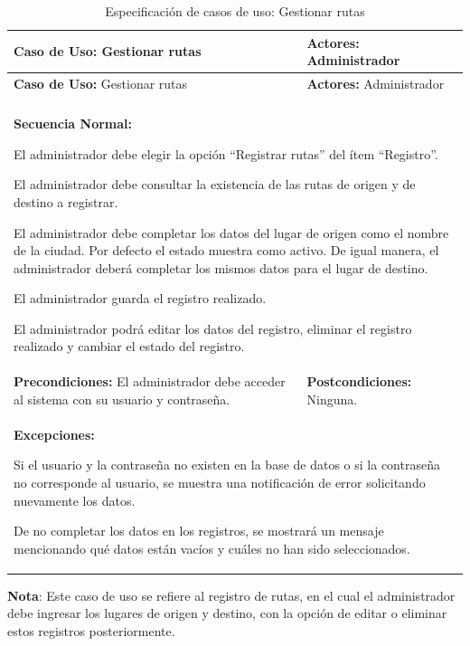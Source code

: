 	
	\begingroup
	
	\begin{longtable}{m{7.5cm}|m{7.5cm}}
		\caption[Especificación de casos de uso: Gestionar rutas]{\newline Especificación de casos de uso: Gestionar rutas} \label{tab:tabla3_4}\\
		\toprule
		\textbf{Caso de Uso:} Gestionar rutas & \textbf{Actores:} Administrador \\
		\midrule
		\endfirsthead
		
		\textbf{Caso de Uso:} Gestionar rutas & \textbf{Actores:} Administrador \\
		\midrule
		\endhead
		
		\bottomrule
		\endlastfoot
		
		\multicolumn{2}{m{15cm}}{\textbf{Descripción:} Este caso de uso hace referencia al registro de los lugares de origen y destino.} \\ \hline
		
		\multicolumn{2}{m{15cm}}{\textbf{Secuencia Normal:}
			
			El administrador debe elegir la opción “Registrar rutas” del ítem “Registro”.
			
			El administrador debe consultar la existencia de las rutas de origen y de destino a registrar.
			
			El administrador debe completar los datos del lugar de origen como el nombre de la ciudad. Por defecto el estado muestra como activo. De igual manera, el administrador deberá completar los mismos datos para el lugar de destino.
			
			El administrador guarda el registro realizado.
			
			El administrador podrá editar los datos del registro, eliminar el registro realizado y cambiar el estado del registro.
		} \\ \hline
		
		\textbf{Precondiciones:} El administrador debe acceder al sistema con su usuario y contraseña. & \textbf{Postcondiciones:} Ninguna. \\ \hline
		
		\multicolumn{2}{m{15cm}}{\textbf{Excepciones:}
			
			Si el usuario y la contraseña no existen en la base de datos o si la contraseña no corresponde al usuario, se muestra una notificación de error solicitando nuevamente los datos.
			
			De no completar los datos en los registros, se mostrará un mensaje mencionando qué datos están vacíos y cuáles no han sido seleccionados.
		} \\
	\end{longtable}
	\endgroup
	\vspace{-6pt}  %
	\textbf{Nota}: Este caso de uso se refiere al registro de rutas, en el cual el administrador debe ingresar los lugares de origen y destino, con la opción de editar o eliminar estos registros posteriormente.	
	
